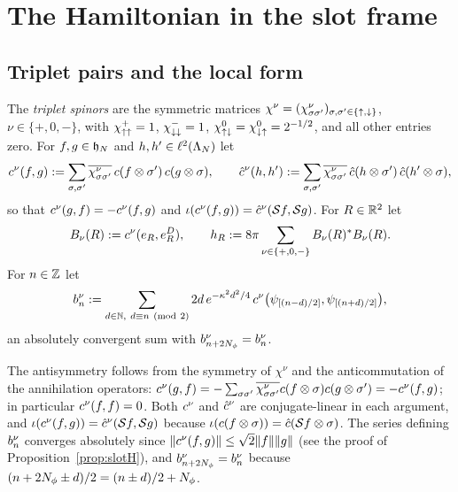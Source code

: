 \section{The Hamiltonian in the slot frame}\label{sec:hamiltonian}

\subsection{Triplet pairs and the local form}

\begin{definition}\label{def:pairs}
The \emph{triplet spinors} are the symmetric matrices $\chi^\nu=(\chi^\nu_{\sigma\sigma'})_{\sigma,\sigma'\in\{{\uparrow},{\downarrow}\}}$,
$\nu\in\{+,0,-\}$, with $\chi^+_{{\uparrow}{\uparrow}}=1$, $\chi^-_{{\downarrow}{\downarrow}}=1$, $\chi^0_{{\uparrow}{\downarrow}}=\chi^0_{{\downarrow}{\uparrow}}=2^{-1/2}$, and all
other entries zero. For $f,g\in\mathfrak{h}_N$ and $h,h'\in\ell^2(\Lambda_N)$ let
\[
c^{\nu}(f,g):=\sum_{\sigma,\sigma'}\overline{\chi^\nu_{\sigma\sigma'}}\,c(f\otimes\sigma')\,c(g\otimes\sigma),\qquad
\hat{c}^{\nu}(h,h'):=\sum_{\sigma,\sigma'}\overline{\chi^\nu_{\sigma\sigma'}}\,\hat{c}(h\otimes\sigma')\,\hat{c}(h'\otimes\sigma),
\]
so that $c^{\nu}(g,f)=-c^{\nu}(f,g)$ and $\iota(c^{\nu}(f,g))=\hat{c}^{\nu}(\mathcal{S} f,\mathcal{S} g)$. For $R\in\mathbb{R}^2$ let
\[
B_\nu(R):=c^{\nu}(e_{R},e^{D}_{R}),\qquad h_R:=8\pi\sum_{\nu\in\{+,0,-\}}B_\nu(R)^*B_\nu(R).
\]
For $n\in\mathbb{Z}$ let
\[
\bcen\nu n:=\sum_{d\in\N,\ d\equiv n\ (\mathrm{mod}\ 2)}2d\,e^{-\kappa^2d^2/4}\,
\cpair\nu\bigl(\psi_{[(n-d)/2]},\psi_{[(n+d)/2]}\bigr),
\]
an absolutely convergent sum with $b^{\nu}_{n+2N_{\phi}}=b^{\nu}_{n}$.
\end{definition}

The antisymmetry follows from the symmetry of $\chi^\nu$ and the anticommutation of the annihilation operators:
$c^{\nu}(g,f)=-\sum_{\sigma\sigma'}\overline{\chi^\nu_{\sigma\sigma'}}c(f\otimes\sigma)c(g\otimes\sigma')=-c^{\nu}(f,g)$; in
particular $c^{\nu}(f,f)=0$. Both $c^{\nu}$ and $\hat{c}^{\nu}$ are conjugate-linear in each argument, and
$\iota(c^{\nu}(f,g))=\hat{c}^{\nu}(\mathcal{S} f,\mathcal{S} g)$ because $\iota(c(f\otimes\sigma))=\hat{c}(\mathcal{S} f\otimes\sigma)$. The series
defining $b^{\nu}_{n}$ converges absolutely since $\lVert c^{\nu}(f,g)\rVert\le\sqrt2\lVert f\rVert\lVert g\rVert$ (see the proof of
Proposition~\ref{prop:slotH}), and $b^{\nu}_{n+2N_{\phi}}=b^{\nu}_{n}$ because $(n+2N_{\phi}\pm d)/2=(n\pm d)/2+N_{\phi}$.

